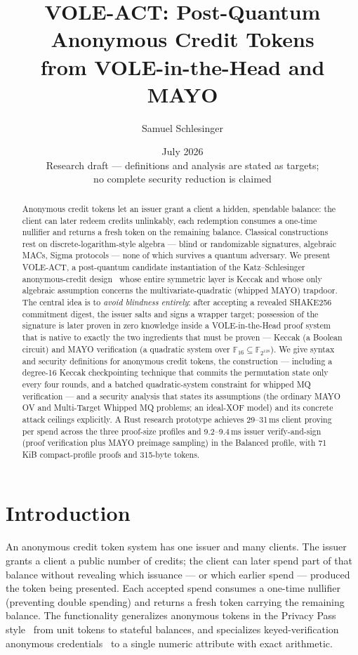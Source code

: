 \documentclass[11pt]{article}
\title{VOLE-ACT: Post-Quantum Anonymous Credit Tokens\\
from VOLE-in-the-Head and MAYO}
\author{Samuel Schlesinger}
\date{July 2026\\[0.5em]\normalsize Research draft --- definitions and analysis are stated as targets;\\
no complete security reduction is claimed}
\newcommand{\F}{\mathbb{F}}
\newcommand{\Fsixteen}{\F_{16}}
\newcommand{\Ftag}{\F_{2^{128}}}
\begin{document}
\maketitle

\begin{abstract}
Anonymous credit tokens let an issuer grant a client a hidden, spendable
balance: the client can later redeem credits unlinkably, each redemption
consumes a one-time nullifier and returns a fresh token on the remaining
balance. Classical constructions rest on discrete-logarithm-style algebra ---
blind or randomizable signatures, algebraic MACs, Sigma protocols --- none of
which survives a quantum adversary. We present VOLE-ACT, a post-quantum
candidate instantiation of the Katz--Schlesinger anonymous-credit design~\cite{KS}
whose entire symmetric layer is Keccak and whose only algebraic assumption
concerns the multivariate-quadratic (whipped MAYO) trapdoor. The central
idea is to \emph{avoid blindness entirely}: after accepting a revealed
SHAKE256 commitment digest, the issuer salts and signs a wrapper target;
possession of the signature is later proven in zero knowledge inside a VOLE-in-the-Head
proof system that is native to exactly the two ingredients that must be
proven --- Keccak (a Boolean circuit) and MAYO verification (a quadratic
system over $\Fsixteen \subseteq \Ftag$). We give syntax and security
definitions for anonymous credit tokens, the construction --- including a
degree-16 Keccak checkpointing technique that commits the permutation state
only every four rounds, and a batched quadratic-system constraint for
whipped MQ verification --- and a security analysis that states its
assumptions (the ordinary MAYO OV and Multi-Target Whipped MQ problems; an
ideal-XOF model) and its concrete attack ceilings explicitly. A Rust
research prototype achieves 29--31\,ms client proving per spend across the
three proof-size profiles and 9.2--9.4\,ms issuer verify-and-sign (proof
verification plus MAYO preimage sampling) in the Balanced profile, with
71\,KiB compact-profile proofs and 315-byte tokens.
\end{abstract}

\section{Introduction}

An anonymous credit token system has one issuer and many clients. The issuer
grants a client a public number of credits; the client can later spend part of
that balance without revealing which issuance --- or which earlier spend ---
produced the token being presented. Each accepted spend consumes a one-time
nullifier (preventing double spending) and returns a fresh token carrying the
remaining balance. The functionality generalizes anonymous tokens in the
Privacy Pass style~\cite{PrivacyPass} from unit tokens to stateful balances,
and specializes keyed-verification anonymous
credentials~\cite{CMZ14} to a single numeric attribute with exact arithmetic.
\end{document}
